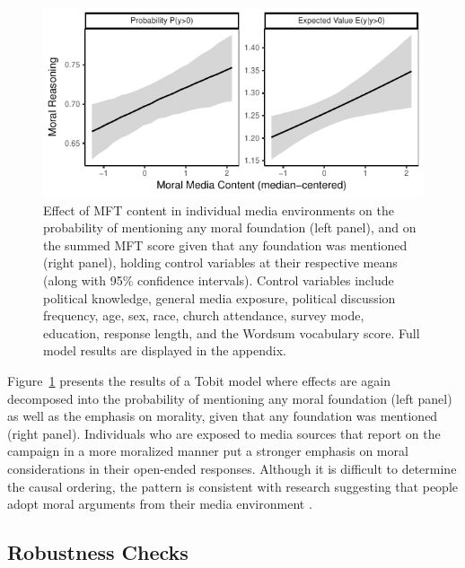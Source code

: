 \documentclass[12pt]{article}
\begin{document}
\begin{figure}[h]\centering
\includegraphics{../calc/fig/tobit_media.pdf}
\caption{Effect of MFT content in individual media environments on the probability of mentioning any moral foundation (left panel), and on the summed MFT score given that any foundation was mentioned (right panel), holding control variables at their respective means (along with 95\% confidence intervals). Control variables include political knowledge, general media exposure, political discussion frequency, age, sex, race, church attendance, survey mode, education, response length, and the Wordsum vocabulary score. Full model results are displayed in the appendix.
}\label{fig:tobit_media}
\end{figure}

Figure~\ref{fig:tobit_media} presents the results of a Tobit model where effects are again decomposed into the probability of mentioning any moral foundation (left panel) as well as the emphasis on morality, given that any foundation was mentioned (right panel). Individuals who are exposed to media sources that report on the campaign in a more moralized manner put a stronger emphasis on moral considerations in their open-ended responses. Although it is difficult to determine the causal ordering, the pattern is consistent with research suggesting that people adopt moral arguments from their media environment \citep[e.g.,][]{clifford2015concerns}. 





\subsection*{Robustness Checks}
\end{document}
